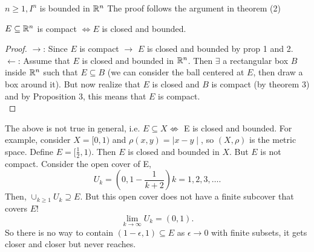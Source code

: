 \documentclass[a4paper]{article}
\begin{document}
\begin{theorem}
  $n \geq 1, I^n$ is bounded in $\mathbb{R}^n$
  The proof follows the argument in theorem (2) 
\end{theorem}

\begin{theorem}
$E \subseteq \mathbb{R}^n$ is compact $\iff E$ is closed and bounded.
\begin{proof}
   $\rightarrow$: Since $E$ is compact  $\to$  $E$ is closed and bounded by prop 1 and 2. \\

   $\leftarrow$: Assume that $E$ is closed and bounded in  $\mathbb{R}^n$. Then $\exists $ a rectangular box $B$ 
    inside $\mathbb{R}^n$ such that $E \subseteq B$ (we can consider the ball centered at $E$, then draw a box around it).
    But now realize that $E$ is closed and  $B$ is compact (by theorem 3) and by Proposition 3, this means that
    $E$ is compact. \\
\end{proof}
\end{theorem}

\begin{note}
  The above is not true in general, i.e. $E \subseteq X \not\iff$ E is closed and bounded. For example, consider
  $X = [0,1)$ and  $\rho(x,y) = \mid x-y\mid $, so $(X, \rho)$ is the metric space. Define  $E= [\frac{1}{2},1)$.
  Then $E$ is closed and bounded  in $ X$. But $E$ is not compact. Consider the open cover of E,
   \[
   U_k = \left( 0, 1 - \frac{1}{k+2} \right)  k = 1,2,3,\ldots 
   .\]
   Then, $\cup_{k \geq 1} U_k \supseteq E$. But this open cover does not have a finite subcover that covers $E$!
   \[
   \lim_{k \to \infty} U_k = \left( 0, 1 \right) 
   .\] 
   So there is no way to contain $\left( 1 - \epsilon,1 \right) \subseteq E$ as $\epsilon \to 0$ with finite subsets, it gets
   closer and closer but never reaches. 
\end{note}
\end{document}
